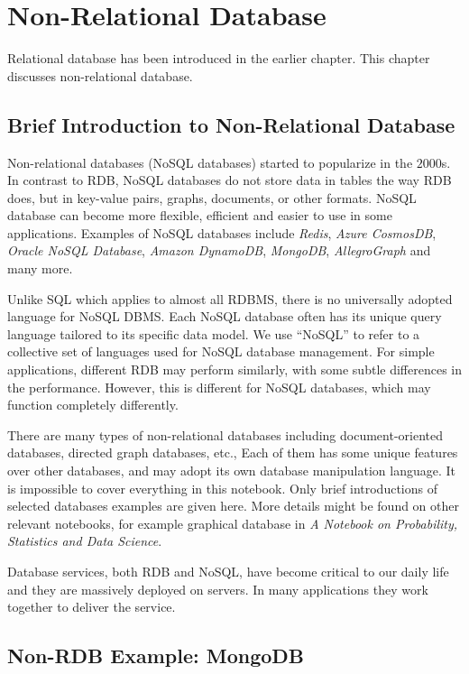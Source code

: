 \chapter{Non-Relational Database} 

Relational database has been introduced in the earlier chapter. This chapter discusses non-relational database.

\section{Brief Introduction to Non-Relational Database}

Non-relational databases (NoSQL databases) started to popularize in the $2000$s. In contrast to RDB, NoSQL databases do not store data in tables the way RDB does, but in key-value pairs, graphs, documents, or other formats. NoSQL database can become more flexible, efficient and easier to use in some applications. Examples of NoSQL databases include \textit{Redis}, \textit{Azure CosmosDB}, \textit{Oracle NoSQL Database}, \textit{Amazon DynamoDB}, \textit{MongoDB}, \textit{AllegroGraph} and many more.

Unlike SQL which applies to almost all RDBMS, there is no universally adopted language for NoSQL DBMS. Each NoSQL database often has its unique query language tailored to its specific data model. We use ``NoSQL'' to refer to a collective set of languages used for NoSQL database management. For simple applications, different RDB may perform similarly, with some subtle differences in the performance. However, this is different for NoSQL databases, which may function completely differently.

There are many types of non-relational databases including document-oriented databases, directed graph databases, etc., Each of them has some unique features over other databases, and may adopt its own database manipulation language. It is impossible to cover everything in this notebook. Only brief introductions of selected databases examples are given here. More details might be found on other relevant notebooks, for example graphical database in \textit{A Notebook on Probability, Statistics and Data Science}.

Database services, both RDB and NoSQL, have become critical to our daily life and they are massively deployed on servers. In many applications they work together to deliver the service.

\section{Non-RDB Example: MongoDB}

